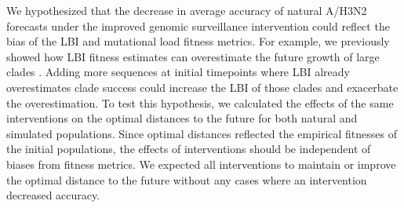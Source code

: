 \documentclass[9pt,lineno]{elife}
\begin{document}
We hypothesized that the decrease in average accuracy of natural A/H3N2 forecasts under the improved genomic surveillance intervention could reflect the bias of the LBI and mutational load fitness metrics.
For example, we previously showed how LBI fitness estimates can overestimate the future growth of large clades \citep{Huddleston2020}.
Adding more sequences at initial timepoints where LBI already overestimates clade success could increase the LBI of those clades and exacerbate the overestimation.
To test this hypothesis, we calculated the effects of the same interventions on the optimal distances to the future for both natural and simulated populations.
Since optimal distances reflected the empirical fitnesses of the initial populations, the effects of interventions should be independent of biases from fitness metrics.
We expected all interventions to maintain or improve the optimal distance to the future without any cases where an intervention decreased accuracy.
\end{document}
